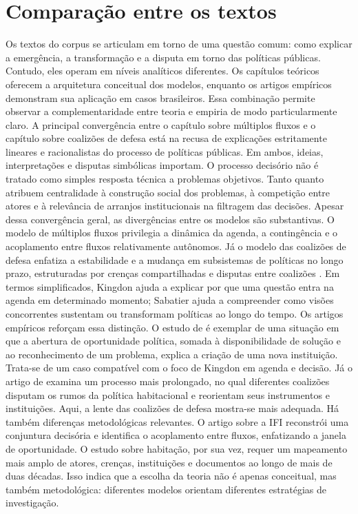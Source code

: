 \documentclass[12pt,a4paper]{article}
\begin{document}
\section{Comparação entre os textos}
\label{sec:org6b74389}
Os textos do corpus se articulam em torno de uma questão comum: como explicar a emergência, a transformação e a disputa em torno das políticas públicas. Contudo, eles operam em níveis analíticos diferentes. Os capítulos teóricos oferecem a arquitetura conceitual dos modelos, enquanto os artigos empíricos demonstram sua aplicação em casos brasileiros. Essa combinação permite observar a complementaridade entre teoria e empiria de modo particularmente claro.
A principal convergência entre o capítulo sobre múltiplos fluxos e o capítulo sobre coalizões de defesa está na recusa de explicações estritamente lineares e racionalistas do processo de políticas públicas. Em ambos, ideias, interpretações e disputas simbólicas importam. O processo decisório não é tratado como simples resposta técnica a problemas objetivos. Tanto \textcite{capella2022multiplos} quanto \textcite{araujoSilva2022coalizoes} atribuem centralidade à construção social dos problemas, à competição entre atores e à relevância de arranjos institucionais na filtragem das decisões.
Apesar dessa convergência geral, as divergências entre os modelos são substantivas. O modelo de múltiplos fluxos privilegia a dinâmica da agenda, a contingência e o acoplamento entre fluxos relativamente autônomos. Já o modelo das coalizões de defesa enfatiza a estabilidade e a mudança em subsistemas de políticas no longo prazo, estruturadas por crenças compartilhadas e disputas entre coalizões \autocites{capella2022multiplos}{araujoSilva2022coalizoes}. Em termos simplificados, Kingdon ajuda a explicar por que uma questão entra na agenda em determinado momento; Sabatier ajuda a compreender como visões concorrentes sustentam ou transformam políticas ao longo do tempo.
Os artigos empíricos reforçam essa distinção. O estudo de \textcite{bijos2024ifi} é exemplar de uma situação em que a abertura de oportunidade política, somada à disponibilidade de solução e ao reconhecimento de um problema, explica a criação de uma nova instituição. Trata-se de um caso compatível com o foco de Kingdon em agenda e decisão. Já o artigo de \textcite{ferreira2019habitacional} examina um processo mais prolongado, no qual diferentes coalizões disputam os rumos da política habitacional e reorientam seus instrumentos e instituições. Aqui, a lente das coalizões de defesa mostra-se mais adequada.
Há também diferenças metodológicas relevantes. O artigo sobre a IFI reconstrói uma conjuntura decisória e identifica o acoplamento entre fluxos, enfatizando a janela de oportunidade. O estudo sobre habitação, por sua vez, requer um mapeamento mais amplo de atores, crenças, instituições e documentos ao longo de mais de duas décadas. Isso indica que a escolha da teoria não é apenas conceitual, mas também metodológica: diferentes modelos orientam diferentes estratégias de investigação.
\end{document}
